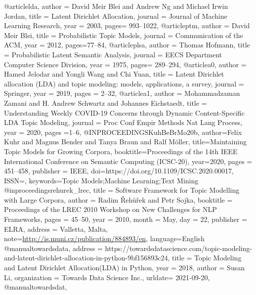 \documentclass[german,version-2020-11]{uzl-thesis}
\begin{document}
\begin{bibtex-entries}


  @article{lda,
  author =       {David Meir Blei and Andrew Ng and Michael Irwin Jordan},
  title =        {Latent Dirichlet Allocation},
  journal =    {Journal of Machine Learning Research},
  year =         {2003},
  pages= {993--1022},
}
  @article{ptm,
  author =       {David Meir Blei},
  title =        {Probabilistic Topic Models},
  journal =    {Communication of the ACM},
  year =         {2012},
  pages={77--84},
}
  @article{plsa,
  author =       {Thomas Hofmann},
  title =        {Probabilistic Latent Semantic Analysis},
  journal =    {EECS Department Computer Science Division},
  year =         {1975},
  pages= {289--294},
}
  @article{a0,
  author =       {Hamed Jelodar and Yongli Wang and Chi Yuan},
  title =        {Latent Dirichlet allocation (LDA) and topic modeling: models, applications, a survey},
  journal =    {Springer},
  year =         {2019},
  pages = {2--32},
}
  @article{a1,
  author =       {Mohammadzaman Zamani and H. Andrew Schwartz and Johannes Eichstaedt},
  title =        {Understanding Weekly COVID-19 Concerns through Dynamic Content-Specific LDA Topic Modeling},
  journal =    {Proc Conf Empir Methods Nat Lang Process},
  year =         {2020},
  pages ={1--6},
}
@INPROCEEDINGS{KuhBeBrMo20b,
author={Felix Kuhr and Magnus Bender and Tanya Braun and Ralf M\"oller},
title={{Maintaining Topic Models for Growing Corpora}},
booktitle={Proceedings of the 14th IEEE International Conference on Semantic Computing (ICSC-20)},
year={2020},
pages     = {451--458},
publisher = {IEEE},
doi={https://doi.org/10.1109/ICSC.2020.00017},
ISSN={},
keywords={Topic Models;Machine Learning;Text Mining}
}
@inproceedings{rehurek_lrec,
      title = {{Software Framework for Topic Modelling with Large Corpora}},
      author = {Radim {\v R}eh{\r u}{\v r}ek and Petr Sojka},
      booktitle = {{Proceedings of the LREC 2010 Workshop on New
           Challenges for NLP Frameworks}},
      pages = {45--50},
      year = 2010,
      month = May,
      day = 22,
      publisher = {ELRA},
      address = {Valletta, Malta},
      note={\url{http://is.muni.cz/publication/884893/en}},
      language={English}
}
  @manual{towardsdata,
  address =       {https://towardsdatascience.com/topic-modeling-and-latent-dirichlet-allocation-in-python-9bf156893c24},
  title =        {Topic Modeling and Latent Dirichlet Allocation(LDA) in Python},
  year =    {2018},
  author = {Susan Li},
  organization = {Towards Data Science Inc.},
  urldate= {2021-09-20},
}
  @manual{towardsdat,
}
\end{bibtex-entries}
\end{document}
